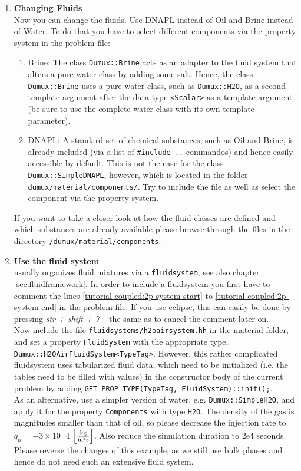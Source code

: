 \begin{enumerate}
\item \textbf{Changing Fluids} \\
Now you can change the fluids. Use DNAPL instead of Oil and Brine instead of Water. To do that you have to select different components via the property system in the problem file:
\begin{enumerate}
 \item Brine: The class \texttt{Dumux::Brine} acts as an adapter to the fluid system that alters a pure water class by adding some salt. Hence, the class \texttt{Dumux::Brine} uses a pure water class, such as \texttt{Dumux::H2O}, as a second template argument after the data type \texttt{<Scalar>} as a template argument (be sure to use the complete water class with its own template parameter).
 \item DNAPL: A standard set of chemical substances, such as Oil and Brine, is already included (via a list of \texttt{\#include ..} commandos) and hence easily accessible by default. This is not the case for the class \texttt{Dumux::SimpleDNAPL}, however, which is located in the folder \texttt{dumux/material/components/}. Try to include the file as well as select the component via the property system.
\end{enumerate}
If you want to take a closer look at how the fluid classes are defined and which substances are already available please browse through the files in the directory
\texttt{/dumux/material/components}.

\item \textbf{Use the \Dumux fluid system}\label{dec-ex1-fluidsystem} \\
\Dumux usually organizes fluid mixtures via a \texttt{fluidsystem}, see also chapter \ref{sec:fluidframework}. In order to include a fluidsystem you first have to comment the lines \ref{tutorial-coupled:2p-system-start} to \ref{tutorial-coupled:2p-system-end} in the problem file. If you use eclipse, this can easily be done by pressing \textit{str + shift + 7} -- the same as to cancel the comment later on.\\
Now include the file \texttt{fluidsystems/h2oairsystem.hh} in the material folder, and set a property \texttt{FluidSystem} with the appropriate type, \texttt{Dumux::H2OAirFluidSystem<TypeTag>}. However, this rather complicated fluidsystem uses tabularized fluid data, which need to be initialized (i.e. the tables need to be filled with values) in the constructor body of the current problem by adding \texttt{GET\_PROP\_TYPE(TypeTag, FluidSystem)::init();}.\\ 
As an alternative, use a simpler version of water, e.g. \texttt{Dumux::SimpleH2O}, and apply it for the property \texttt{Components} with type \texttt{H2O}. The density of the gas is magnitudes smaller than that of oil, so please decrease the injection rate to $q_n = -3 \times 10^-4$ $\left[\frac{\textnormal{kg}}{\textnormal{m}^2 \textnormal{s}}\right]$. Also reduce the simulation duration to 2e4 seconds.\\
Please reverse the changes of this example, as we still use bulk phases and hence do not need such an extensive fluid system.
 

\end{enumerate}
